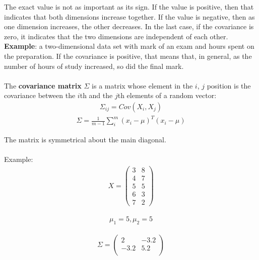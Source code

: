 \documentclass{report}
\begin{document}
The exact value is not as important as its sign. If the value is positive, then that indicates that both dimensions increase together.
If the value is negative, then as one dimension increases, the other decreases.
In the last case, if the covariance is zero, it indicates that the two dimensions are independent of each other.
\\
{\bf Example}: a two-dimensional data set with mark of an exam and hours spent on the preparation. If the covariance is positive, that means that, in general, as the number of hours of study increased, so did the final mark.
\\
\\
The {\bf covariance matrix} $\Sigma$ is a matrix whose element in the $i$, $j$ position is the covariance between the $i$th and the $j$th elements of a random vector:
\begin{align*}
\Sigma_{ij} = Cov(X_i, X_j)
\end{align*}
\begin{align*}
\Sigma = \frac{1}{m-1}\sum_i^m (x_i-\mu)^T(x_i-\mu)
\end{align*}

The matrix is symmetrical about the main diagonal.
\\
\\
Example:
\begin{align*}
X = \begin{pmatrix}
3 & 8\\
4 & 7\\
5 & 5\\
6 & 3\\
7 & 2
\end{pmatrix}
\end{align*}

\begin{align*}
\mu_1 = 5, \mu_2 = 5
\end{align*}

\begin{align*}
\Sigma = \begin{pmatrix}
2 & -3.2\\
-3.2 & 5.2\\
\end{pmatrix}
\end{align*}
\end{document}
